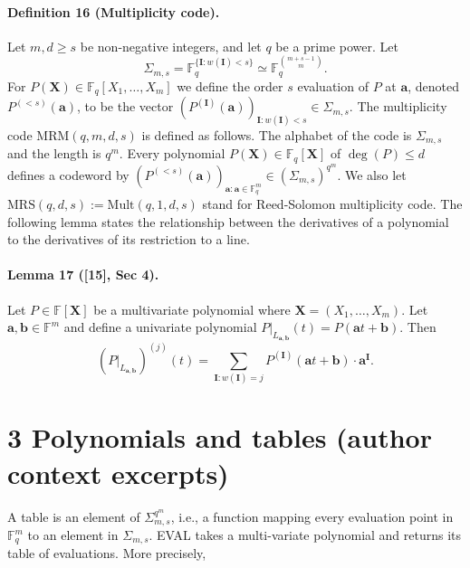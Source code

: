\paragraph{Definition 16 (Multiplicity code).} Let $m,d\geq s$ be non-negative integers, and let $q$ be a prime power. Let
\[\Sigma_{m,s}=\mathbb F_q^{\{\boldsymbol I:w(\boldsymbol I)<s\}}\simeq\mathbb F_q^{\binom{m+s-1}{m}}.\]
For $P(\boldsymbol X)\in\mathbb F_q[X_1,\ldots,X_m]$ we define the order $s$ evaluation of $P$ at $\boldsymbol a$, denoted $P^{(<s)}(\boldsymbol a)$, to be the vector $(P^{(\boldsymbol I)}(\boldsymbol a))_{\boldsymbol I:w(\boldsymbol I)<s}\in\Sigma_{m,s}$. The multiplicity code $\mathrm{MRM}(q,m,d,s)$ is defined as follows. The alphabet of the code is $\Sigma_{m,s}$ and the length is $q^m$. Every polynomial $P(\boldsymbol X)\in\mathbb F_q[\boldsymbol X]$ of $\deg(P)\leq d$ defines a codeword by $(P^{(<s)}(\boldsymbol a))_{\boldsymbol a:\boldsymbol a\in\mathbb F_q^m}\in(\Sigma_{m,s})^{q^m}$.
We also let $\mathrm{MRS}(q,d,s):=\mathrm{Mult}(q,1,d,s)$ stand for Reed-Solomon multiplicity code.
The following lemma states the relationship between the derivatives of a polynomial to the derivatives of its restriction to a line.
\paragraph{Lemma 17 ([15], Sec 4).} Let $P\in\mathbb F[\boldsymbol X]$ be a multivariate polynomial where $\boldsymbol X=(X_1,\ldots,X_m)$. Let $\boldsymbol a,\boldsymbol b\in\mathbb F^m$ and define a univariate polynomial $P|_{L_{\boldsymbol a,\boldsymbol b}}(t)=P(\boldsymbol a t+\boldsymbol b)$. Then
\[(P|_{L_{\boldsymbol a,\boldsymbol b}})^{(j)}(t)=\sum_{\boldsymbol I:w(\boldsymbol I)=j}P^{(\boldsymbol I)}(\boldsymbol a t+\boldsymbol b)\cdot\boldsymbol a^{\boldsymbol I}.\]
\section*{3 Polynomials and tables (author context excerpts)}
A table is an element of $\Sigma_{m,s}^{q^m}$, i.e., a function mapping every evaluation point in $\mathbb F_q^m$ to an element in $\Sigma_{m,s}$. EVAL takes a multi-variate polynomial and returns its table of evaluations. More precisely,
